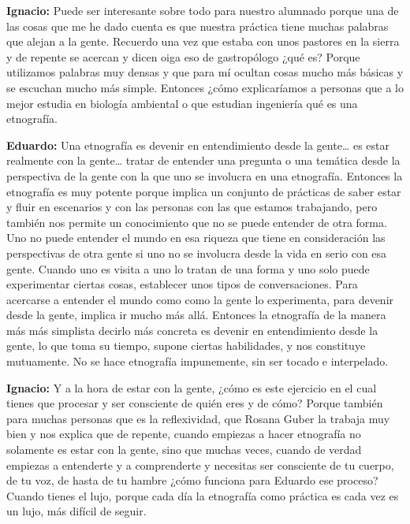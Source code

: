 \documentclass[
]{interact}
\begin{document}
\textbf{Ignacio:} Puede ser interesante sobre todo para nuestro alumnado
porque una de las cosas que me he dado cuenta es que nuestra práctica
tiene muchas palabras que alejan a la gente. Recuerdo una vez que estaba
con unos pastores en la sierra y de repente se acercan y dicen oiga eso
de gastropólogo ¿qué es? Porque utilizamos palabras muy densas y que
para mí ocultan cosas mucho más básicas y se escuchan mucho más simple.
Entonces ¿cómo explicaríamos a personas que a lo mejor estudia en
biología ambiental o que estudian ingeniería qué es una etnografía.

\textbf{Eduardo:} Una etnografía es devenir en entendimiento desde la
gente\ldots{} es estar realmente con la gente\ldots{} tratar de entender
una pregunta o una temática desde la perspectiva de la gente con la que
uno se involucra en una etnografía. Entonces la etnografía es muy
potente porque implica un conjunto de prácticas de saber estar y fluir
en escenarios y con las personas con las que estamos trabajando, pero
también nos permite un conocimiento que no se puede entender de otra
forma. Uno no puede entender el mundo en esa riqueza que tiene en
consideración las perspectivas de otra gente si uno no se involucra
desde la vida en serio con esa gente. Cuando uno es visita a uno lo
tratan de una forma y uno solo puede experimentar ciertas cosas,
establecer unos tipos de conversaciones. Para acercarse a entender el
mundo como como la gente lo experimenta, para devenir desde la gente,
implica ir mucho más allá. Entonces la etnografía de la manera más más
simplista decirlo más concreta es devenir en entendimiento desde la
gente, lo que toma su tiempo, supone ciertas habilidades, y nos
constituye mutuamente. No se hace etnografía impunemente, sin ser tocado
e interpelado.

\textbf{Ignacio:} Y a la hora de estar con la gente, ¿cómo es este
ejercicio en el cual tienes que procesar y ser consciente de quién eres
y de cómo? Porque también para muchas personas que es la reflexividad,
que Rosana Guber la trabaja muy bien y nos explica que de repente,
cuando empiezas a hacer etnografía no solamente es estar con la gente,
sino que muchas veces, cuando de verdad empiezas a entenderte y a
comprenderte y necesitas ser consciente de tu cuerpo, de tu voz, de
hasta de tu hambre ¿cómo funciona para Eduardo ese proceso? Cuando
tienes el lujo, porque cada día la etnografía como práctica es cada vez
es un lujo, más difícil de seguir.
\end{document}
